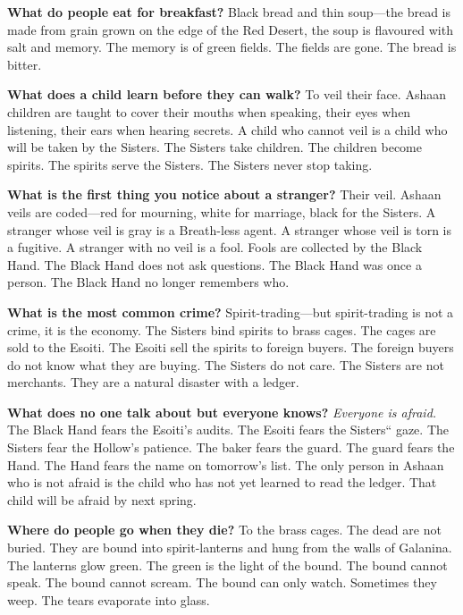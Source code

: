 \vspace{1em}

\begin{almanac}
\textbf{What do people eat for breakfast?} Black bread and thin soup---the bread is made from grain grown on the edge of the Red Desert, the soup is flavoured with salt and memory. The memory is of green fields. The fields are gone. The bread is bitter.

\textbf{What does a child learn before they can walk?} To veil their face. Ashaan children are taught to cover their mouths when speaking, their eyes when listening, their ears when hearing secrets. A child who cannot veil is a child who will be taken by the Sisters. The Sisters take children. The children become spirits. The spirits serve the Sisters. The Sisters never stop taking.

\textbf{What is the first thing you notice about a stranger?} Their veil. Ashaan veils are coded---red for mourning, white for marriage, black for the Sisters. A stranger whose veil is gray is a Breath-less agent. A stranger whose veil is torn is a fugitive. A stranger with no veil is a fool. Fools are collected by the Black Hand. The Black Hand does not ask questions. The Black Hand was once a person. The Black Hand no longer remembers who.

\textbf{What is the most common crime?} Spirit-trading---but spirit-trading is not a crime, it is the economy. The Sisters bind spirits to brass cages. The cages are sold to the Esoiti. The Esoiti sell the spirits to foreign buyers. The foreign buyers do not know what they are buying. The Sisters do not care. The Sisters are not merchants. They are a natural disaster with a ledger.

\textbf{What does no one talk about but everyone knows?} \textit{Everyone is afraid.} The Black Hand fears the Esoiti's audits. The Esoiti fears the Sisters`` gaze. The Sisters fear the Hollow's patience. The baker fears the guard. The guard fears the Hand. The Hand fears the name on tomorrow's list. The only person in Ashaan who is not afraid is the child who has not yet learned to read the ledger. That child will be afraid by next spring.

\textbf{Where do people go when they die?} To the brass cages. The dead are not buried. They are bound into spirit-lanterns and hung from the walls of Galanina. The lanterns glow green. The green is the light of the bound. The bound cannot speak. The bound cannot scream. The bound can only watch. Sometimes they weep. The tears evaporate into glass.


\end{almanac}
